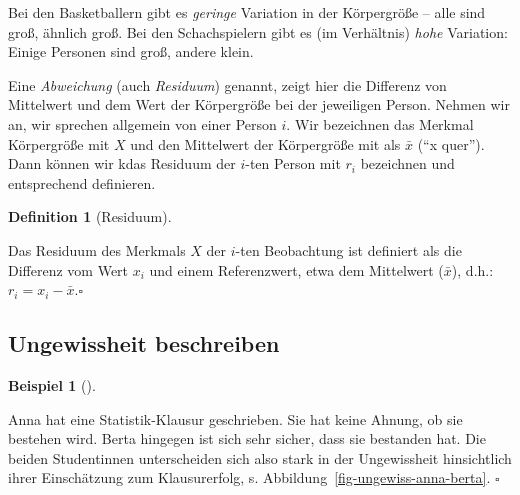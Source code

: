 \documentclass[
  letterpaper,
  twoside,
  open=any]{scrbook}
\theoremstyle{definition}
\theoremstyle{definition}
\newtheorem{example}{Beispiel}[chapter]
\theoremstyle{definition}
\newtheorem{definition}{Definition}[chapter]
\theoremstyle{remark}
\begin{document}
Bei den Basketballern gibt es \emph{geringe} Variation in der
Körpergröße -- alle sind groß, ähnlich groß. Bei den Schachspielern gibt
es (im Verhältnis) \emph{hohe} Variation: Einige Personen sind groß,
andere klein.

Eine \emph{Abweichung} (auch \emph{Residuum}) genannt, zeigt hier die
Differenz von Mittelwert und dem Wert der Körpergröße bei der jeweiligen
Person. Nehmen wir an, wir sprechen allgemein von einer Person \(i\).
Wir bezeichnen das Merkmal Körpergröße mit \(X\) und den Mittelwert der
Körpergröße mit als \(\bar{x}\) (\enquote{x quer}). Dann können wir kdas
Residuum der \(i\)-ten Person mit \(r_i\) bezeichnen und entsprechend
definieren.

\begin{definition}[Residuum]\protect\hypertarget{def-residuum}{}\label{def-residuum}

Das Residuum des Merkmals \(X\) der \(i\)-ten Beobachtung ist definiert
als die Differenz vom Wert \(x_i\) und einem Referenzwert, etwa dem
Mittelwert (\(\bar{x}\)), d.h.: \(r_i = x_i - \bar{x}.\square\)

\end{definition}

\subsection{Ungewissheit beschreiben}\label{ungewissheit-beschreiben}

\begin{example}[]\protect\hypertarget{exm-ungewiss1}{}\label{exm-ungewiss1}

Anna hat eine Statistik-Klausur geschrieben. Sie hat keine Ahnung, ob
sie bestehen wird. Berta hingegen ist sich sehr sicher, dass sie
bestanden hat. Die beiden Studentinnen unterscheiden sich also stark in
der Ungewissheit hinsichtlich ihrer Einschätzung zum Klausurerfolg, s.
Abbildung~\ref{fig-ungewiss-anna-berta}. \(\square\)

\end{example}
\end{document}
